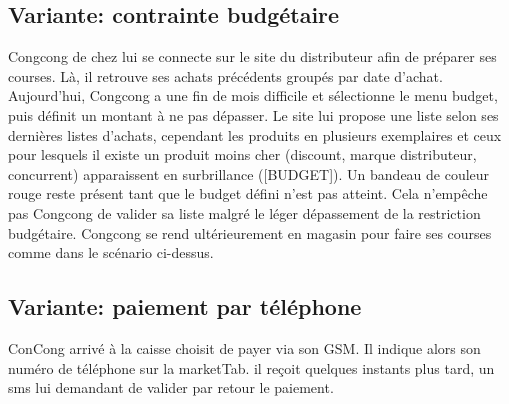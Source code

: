 \subsection{Variante: contrainte budgétaire}
Congcong de chez lui se connecte sur le site du distributeur afin de préparer ses courses.
Là, il retrouve ses achats précédents groupés par date d'achat.
Aujourd'hui, Congcong a une fin de mois difficile et sélectionne le menu budget, puis définit un montant à ne pas dépasser.
Le site lui propose une liste selon ses dernières listes d'achats, cependant les produits en plusieurs exemplaires et ceux pour lesquels il existe un produit moins cher (discount, marque distributeur, concurrent) apparaissent en surbrillance ([BUDGET]).
Un bandeau de couleur rouge reste présent tant que le budget défini n'est pas atteint.
Cela n'empêche pas Congcong de valider sa liste malgré le léger dépassement de la restriction budgétaire.
Congcong se rend ultérieurement en magasin pour faire ses courses comme dans le scénario ci-dessus.

\subsection{Variante: paiement par téléphone}
ConCong arrivé à la caisse choisit de payer via son GSM. 
Il indique alors son numéro de téléphone sur la marketTab. il reçoit quelques instants plus tard, un sms lui demandant de valider par retour le paiement.
